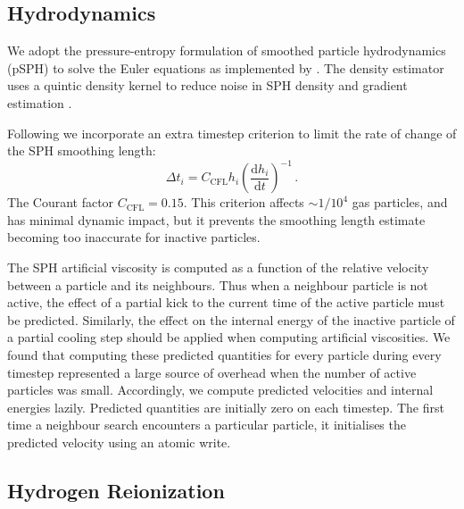 \documentclass[fleqn,usenatbib]{mnras}
\begin{document}
\subsection{Hydrodynamics}

We adopt the pressure-entropy formulation of smoothed particle hydrodynamics (pSPH) to solve the Euler equations \citep{2013MNRAS.428.2840H,2010MNRAS.405.1513R} as implemented by \cite{2014MNRAS.440.1865F}. The density estimator uses a quintic density kernel to reduce noise in SPH density and gradient estimation \citep{2012JCoPh.231..759P}.

Following \cite{2020arXiv201003567S} we incorporate an extra timestep criterion to limit the rate of change of the SPH smoothing length:
\begin{equation}
    \Delta t_i = C_\mathrm{CFL} h_i\left(\frac{\mathrm{d} h_i}{\mathrm{d}t}\right)^{-1}\,.
\end{equation}
The Courant factor $C_\mathrm{CFL} = 0.15$. This criterion affects $\sim 1/10^{4}$ gas particles, and has minimal dynamic impact, but it prevents the smoothing length estimate becoming too inaccurate for inactive particles. 

The SPH artificial viscosity is computed as a function of the relative velocity between a particle and its neighbours. Thus when a neighbour particle is not active, the effect of a partial kick to the current time of the active particle must be predicted. Similarly, the effect on the internal energy of the inactive particle of a partial cooling step should be applied when computing artificial viscosities. We found that computing these predicted quantities for every particle during every timestep represented a large source of overhead when the number of active particles was small. Accordingly, we compute predicted velocities and internal energies lazily. Predicted quantities are initially zero on each timestep. The first time a neighbour search encounters a particular particle, it initialises the predicted velocity using an atomic write.

\subsection{Hydrogen Reionization}
\label{sec:hydrogen}
\end{document}
